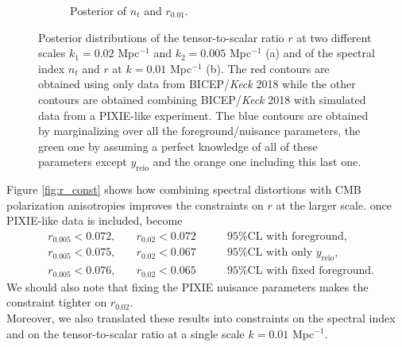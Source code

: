 \begin{figure}[t]
\begin{subfigure}[b]{.49\textwidth}
            \caption{Posterior of $n_t$ and $r_{0.01}$.}
            \label{fig:nt_const} 
        \end{subfigure}
        \caption{Posterior distributions of the tensor-to-scalar ratio $r$ at two different scales $k_1=0.02$ Mpc$^{-1}$ and $k_2=0.005$ Mpc$^{-1}$ (a) and of the spectral index $n_t$ and $r$ at $k=0.01$ Mpc$^{-1}$ (b). The red contours are obtained using only data from BICEP/\textit{Keck} 2018 \cite{Ade_2021} while the other contours are obtained combining BICEP/\textit{Keck} 2018 with simulated data from a PIXIE-like experiment. The blue contours are obtained by marginalizing over all the foreground/nuisance parameters, the green one by assuming a perfect knowledge of all of these parameters except $y_\text{reio}$ and the orange one including this last one.}       
    \end{figure}
Figure \ref{fig:r_const} shows how combining spectral distortions with CMB polarization anisotropies improves the constraints on $r$ at the larger scale. 
once PIXIE-like data is included, become 
\begin{align*}
    &r_{0.005}<0.072,\quad &r_{0.02}<0.072\qquad&\text{95\%CL with foreground,}\\
    &r_{0.005}<0.075,\quad &r_{0.02}<0.067\qquad&\text{95\%CL with only $y_{\text{reio}}$,}\\
    &r_{0.005}<0.076,\quad &r_{0.02}<0.065\qquad&\text{95\%CL with fixed foreground}.
\end{align*}
We should also note that fixing the PIXIE nuisance parameters makes the constraint tighter on $r_{0.02}$.\\ 
Moreover, we also translated these results into constraints on the spectral index and on the tensor-to-scalar ratio at a single scale $k=0.01$ Mpc$^{-1}$. 
